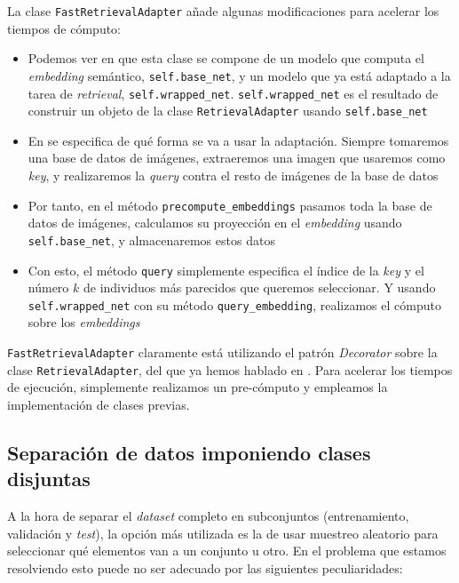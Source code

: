 La clase \lstinline{FastRetrievalAdapter} añade algunas modificaciones para acelerar los tiempos de cómputo:

\begin{itemize}
    \item Podemos ver en  que esta clase se compone de un modelo que computa el \textit{embedding} semántico, \lstinline{self.base_net}, y un modelo que ya está adaptado a la tarea de \textit{retrieval}, \lstinline{self.wrapped_net}. \lstinline{self.wrapped_net} es el resultado de construir un objeto de la clase \lstinline{RetrievalAdapter} usando \lstinline{self.base_net}
    \item En  se especifica de qué forma se va a usar la adaptación. Siempre tomaremos una base de datos de imágenes, extraeremos una imagen que usaremos como \textit{key}, y realizaremos la \textit{query} contra el resto de imágenes de la base de datos
    \item Por tanto, en el método \lstinline{precompute_embeddings} pasamos toda la base de datos de imágenes, calculamos su proyección en el \textit{embedding} usando \lstinline{self.base_net}, y almacenaremos estos datos
    \item Con esto, el método \lstinline{query} simplemente especifica el índice de la \textit{key} y el número $k$ de individuos más parecidos que queremos seleccionar. Y usando \lstinline{self.wrapped_net} con su método \lstinline{query_embedding}, realizamos el cómputo sobre los \textit{embeddings}
\end{itemize}

\begin{sloppypar}
\lstinline{FastRetrievalAdapter} claramente está utilizando el patrón \textit{Decorator} sobre la clase \lstinline{RetrievalAdapter}, del que ya hemos hablado en . Para acelerar los tiempos de ejecución, simplemente realizamos un pre-cómputo y empleamos la implementación de clases previas.
\end{sloppypar}

\subsection{Separación de datos imponiendo clases disjuntas}

A la hora de separar el \textit{dataset} completo en subconjuntos (entrenamiento, validación y \textit{test}), la opción más utilizada es la de usar muestreo aleatorio para seleccionar qué elementos van a un conjunto u otro. En el problema que estamos resolviendo esto puede no ser adecuado por las siguientes peculiaridades:

